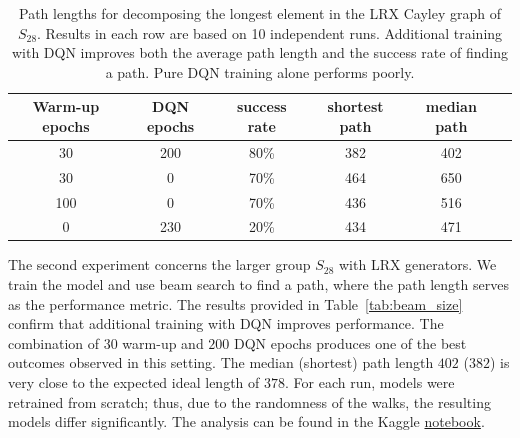 \documentclass[reqno,11pt]{amsart}
\begin{document}
\begin{table}[ht]
    \centering
    \begin{tabular}{|c|c|c|c|c|c|}
        \hline
        Warm-up epochs  & DQN epochs  & success rate & shortest path & median path \\
        \hline\hline
        30 & 200 & 80\%  &  382 & 402  \\
        \hline
        30 &  0 & 70\%  & 464 &  650  \\
        \hline
        100 &  0 & 70\%  & 436 & 516  \\
        \hline
        0 &  230 & 20\%  & 434 & 471  \\
        \hline
    \end{tabular}
    \captionsetup{skip=10pt} 
    \caption{Path lengths for decomposing the longest element in the LRX Cayley graph of $S_{28}$.
    Results in each row are based on 10 independent runs. Additional training with DQN improves both the average path length and the success rate of finding a path. Pure DQN training alone performs poorly. }
    \label{tab:DQN_28}
\end{table}

The second experiment concerns the larger group $S_{28}$ with LRX generators. We train the model and use beam search to find a path, where the path length serves as the performance metric. The results provided in Table~\ref{tab:beam_size} confirm that additional training with DQN improves performance. The combination of $30$ warm-up and $200$ DQN epochs produces one of the best outcomes observed in this setting. The median (shortest) path length $402$ ($382$) is very close to the expected ideal length of $378$. For each run, models were retrained from scratch; thus, due to the randomness of the walks, the resulting models differ significantly. The analysis can be found in the Kaggle \href{https://www.kaggle.com/code/alexandervc/lrx-cayleypy-rl-mdqn}{notebook}. 
\end{document}
